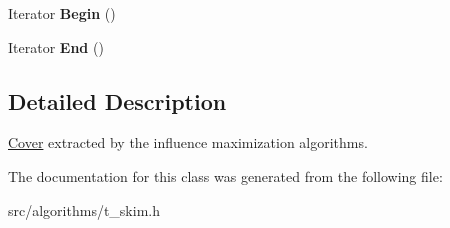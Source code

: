 \begin{DoxyCompactItemize}
\item 
\hypertarget{classall__distance__sketch_1_1Cover_a13a97b2eb936508eeff66e9e938b7906}{}Iterator {\bfseries Begin} ()\label{classall__distance__sketch_1_1Cover_a13a97b2eb936508eeff66e9e938b7906}

\item 
\hypertarget{classall__distance__sketch_1_1Cover_a33a0fe311d66e5ce810a1c6f6cebcbe0}{}Iterator {\bfseries End} ()\label{classall__distance__sketch_1_1Cover_a33a0fe311d66e5ce810a1c6f6cebcbe0}

\end{DoxyCompactItemize}


\subsection{Detailed Description}
\hyperlink{classall__distance__sketch_1_1Cover}{Cover} extracted by the influence maximization algorithms. 

The documentation for this class was generated from the following file\+:\begin{DoxyCompactItemize}
\item 
src/algorithms/t\+\_\+skim.\+h\end{DoxyCompactItemize}
